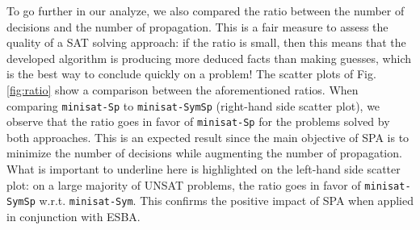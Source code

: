 To go further in our analyze, we also compared the ratio between the number of
decisions and the number of propagation. This is a fair measure to assess the
quality of a SAT solving approach: if the ratio is small, then this means that
the developed algorithm is producing more deduced facts than making guesses,
which is the best way to conclude quickly on a problem!
The scatter plots of Fig.\ref{fig:ratio} show a comparison between the
aforementioned ratios. When comparing \texttt{minisat-Sp} to
\texttt{minisat-SymSp} (right-hand side scatter plot), we observe that the
ratio goes in favor of \texttt{minisat-Sp} for the problems solved by both
approaches. This is an expected result since the main objective of SPA is to
minimize the number of decisions while augmenting the number of propagation.
What is important to underline here is highlighted on the left-hand side
scatter plot: on a large majority of UNSAT problems, the ratio goes in favor
of \texttt{minisat-SymSp} w.r.t. \texttt{minisat-Sym}. This confirms the
positive impact of SPA when applied in conjunction with ESBA.
%
%
%
% 
